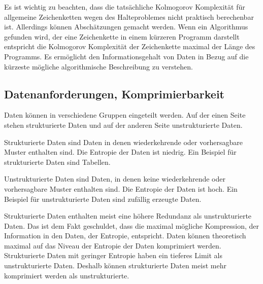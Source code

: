 \documentclass[conference]{IEEEtran}
\begin{document}
Es ist wichtig zu beachten, dass die tatsächliche Kolmogorov Komplexität für
allgemeine Zeichenketten wegen des Halteproblemes nicht praktisch
berechenbar ist. \cite{OPPaper}
Allerdings können Abschätzungen gemacht werden.
Wenn ein Algorithmus gefunden wird, der eine Zeichenkette in einem kürzeren
Programm darstellt entspricht die Kolmogorov Komplexität der Zeichenkette
maximal der Länge des Programms.
Es ermöglicht den Informationsgehalt von Daten in
Bezug auf die kürzeste mögliche algorithmische Beschreibung zu verstehen.


\subsection{Datenanforderungen, Komprimierbarkeit}

Daten können in verschiedene Gruppen eingeteilt werden.
Auf der einen Seite stehen strukturierte Daten und auf der anderen Seite
unstrukturierte Daten.

Strukturierte Daten sind Daten in denen wiederkehrende oder vorhersagbare Muster
enthalten sind.
Die Entropie der Daten ist niedrig.
Ein Beispiel für strukturierte Daten sind Tabellen.

Unstrukturierte Daten sind Daten, in denen keine wiederkehrende oder vorhersagbare
Muster enthalten sind.
Die Entropie der Daten ist hoch.
Ein Beispiel für unstrukturierte Daten sind zufällig erzeugte Daten.

Strukturierte Daten enthalten meist eine höhere Redundanz als unstrukturierte
Daten.
Das ist dem Fakt geschuldet, dass die maximal mögliche Kompression, der Information in den
Daten, der Entropie, entspricht.
Daten können theoretisch maximal auf das Niveau der Entropie der Daten komprimiert werden.
Strukturierte Daten mit geringer Entropie haben ein tieferes Limit als unstrukturierte Daten.
Deshalb können strukturierte Daten meist mehr komprimiert werden als unstrukturierte.
\end{document}
